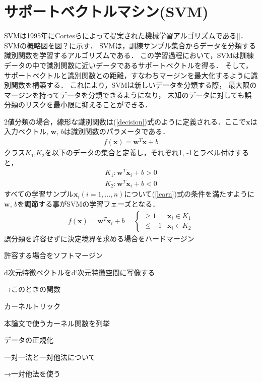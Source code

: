 \section{サポートベクトルマシン(SVM)}
SVMは1995年にCortesらによって提案された機械学習アルゴリズムである[\cite{svm}]．
SVMの概略図を図？に示す．
SVMは，訓練サンプル集合からデータを分類する識別関数を学習するアルゴリズムである．
この学習過程において，SVMは訓練データの中で識別関数に近いデータであるサポートベクトルを得る．
そして，サポートベクトルと識別関数との距離，すなわちマージンを最大化するように識別関数を構築する．
これにより，SVMは新しいデータを分類する際，
最大限のマージンを持ってデータを分類できるようになり，
未知のデータに対しても誤分類のリスクを最小限に抑えることができる．

2値分類の場合，線形な識別関数は(\ref{decision})式のように定義される．ここで$\boldsymbol{x}$は入力ベクトル,
 $\boldsymbol{w}$, $b$は識別関数のパラメータである．
\begin{align}
    \label{decision}
f(\boldsymbol{x}) = \boldsymbol{w}^T \boldsymbol{x} + b
\end{align}
クラス$K_1$,$K_2$を以下のデータの集合と定義し，それぞれ1, -1とラベル付けすると，
\begin{align*}
    K_1:\boldsymbol{w}^T \boldsymbol{x}_i + b > 0\\
    K_2:\boldsymbol{w}^T \boldsymbol{x}_i + b < 0
\end{align*}
すべての学習サンプル$\boldsymbol{x}_i(i=1,...,n)$について(\ref{learn})式の条件を満たすように
$\boldsymbol{w}$, $b$を調節する事がSVMの学習フェーズとなる．
\begin{align}
    \label{learn}
    f(\boldsymbol{x}) = \boldsymbol{w}^T \boldsymbol{x}_i + b =
    \begin{cases}
        \geq 1&  \boldsymbol{x}_i \in K_1 \\
        \leq  -1& \boldsymbol{x}_i \in K_2
    \end{cases}
\end{align}
誤分類を許容せずに決定境界を求める場合をハードマージン

許容する場合をソフトマージン

d次元特徴ベクトルをd`次元特徴空間に写像する

→このときの関数

カーネルトリック

本論文で使うカーネル関数を列挙

データの正規化

一対一法と一対他法について

→一対他法を使う



